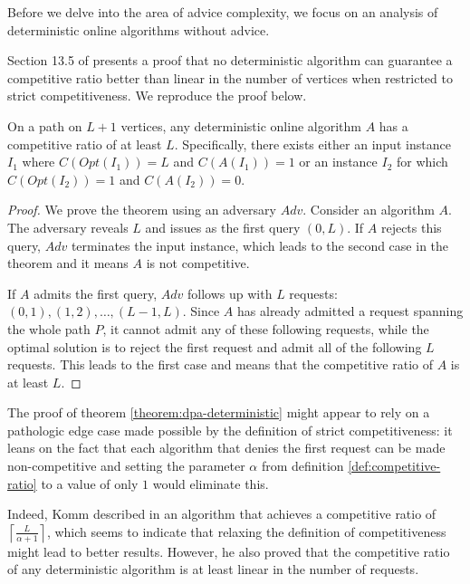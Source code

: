 Before we delve into the area of advice complexity, we focus on an
analysis of deterministic online algorithms without advice.

Section 13.5 of \cite{dpa-book} presents a proof that no deterministic
algorithm can guarantee a competitive ratio better than linear in the
number of vertices when restricted to strict competitiveness. We reproduce
the proof below.

\begin{theorem}\label{theorem:dpa-deterministic}
    On a path on $L+1$ vertices, any deterministic online algorithm $A$
    has a competitive ratio of at least $L$. Specifically, there exists
    either an input instance $I_1$ where $C(Opt(I_1)) = L$ and
    $C(A(I_1)) = 1$ or an instance $I_2$ for which $C(Opt(I_2)) = 1$ and
    $C(A(I_2)) = 0$.
\end{theorem}

\begin{proof}
    We prove the theorem using an adversary $Adv$. Consider an algorithm
    $A$. The adversary reveals $L$ and issues as the first query $(0, L)$.
    If $A$ rejects this query, $Adv$ terminates the input instance, which
    leads to the second case in the theorem and it means $A$ is not
    competitive.

    If $A$ admits the first query, $Adv$ follows up with $L$ requests:
    $(0, 1),\allowbreak (1, 2),\allowbreak \dots,\allowbreak (L - 1, L)$.
    Since $A$ has already admitted a request spanning the whole path $P$,
    it cannot admit any of these following requests, while the optimal
    solution is to reject the first request and admit all of the following
    $L$ requests. This leads to the first case and means that the
    competitive ratio of $A$ is at least $L$.
\end{proof}

The proof of theorem \ref{theorem:dpa-deterministic} might appear to rely
on a pathologic edge case made possible by the definition of strict
competitiveness: it leans on the fact that each algorithm that denies the
first request can be made non-competitive and setting the parameter
$\alpha$ from definition \ref{def:competitive-ratio} to a value of only
$1$ would eliminate this.

Indeed, Komm described in \cite{komm-thesis} an algorithm that achieves a
competitive ratio of $\left\lceil\frac{L}{\alpha+1}\right\rceil$, which
seems to indicate that relaxing the definition of competitiveness might
lead to better results. However, he also proved that the competitive ratio
of any deterministic algorithm is at least linear in the number of
requests.

